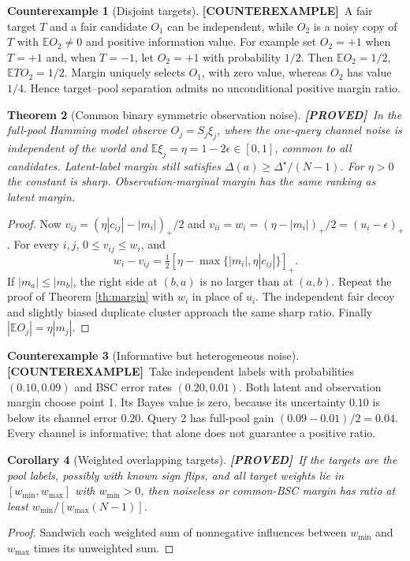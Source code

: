 \documentclass[11pt]{article}
\newtheorem{theorem}{Theorem}[section]
\newtheorem{corollary}[theorem]{Corollary}
\theoremstyle{definition}
\newtheorem{example}[theorem]{Counterexample}
\newcommand{\E}{\mathbb E}
\newcommand{\1}{\mathbf 1}
\newcommand{\pr}{\textbf{[PROVED]}}
\newcommand{\ce}{\textbf{[COUNTEREXAMPLE]}}
\begin{document}
\begin{example}[Disjoint targets]\label{ex:heldout}
\ce\ A fair target $T$ and a fair candidate $O_1$ can be independent, while
$O_2$ is a noisy copy of $T$ with $\E O_2\ne0$ and positive information value.
For example set $O_2=+1$ when $T=+1$ and, when $T=-1$, let $O_2=+1$ with
probability $1/2$. Then $\E O_2=1/2$, $\E TO_2=1/2$.
Margin uniquely selects $O_1$, with zero value, whereas $O_2$ has value $1/4$.
Hence target--pool separation admits no unconditional positive margin ratio.
\end{example}

\begin{theorem}[Common binary symmetric observation noise]\label{th:bsc}
\pr\ In the full-pool Hamming model observe $O_j=S_j\xi_j$, where the
one-query channel noise is independent of the world and
$\E\xi_j=\eta=1-2\epsilon\in[0,1]$, common to all candidates.
Latent-label margin still satisfies $\Delta(a)\ge\Delta^\star/(N-1)$.
For $\eta>0$ the constant is sharp. Observation-marginal margin has the same
ranking as latent margin.
\end{theorem}
\begin{proof}
Now $v_{ij}=(\eta|c_{ij}|-|m_i|)_+/2$ and
$v_{ii}=w_i=(\eta-|m_i|)_+/2=(u_i-\epsilon)_+$.
For every $i,j$, $0\le v_{ij}\le w_i$, and
\[
 w_i-v_{ij}=\tfrac12[\eta-\max\{|m_i|,\eta|c_{ij}|\}]_+.
\]
If $|m_a|\le|m_b|$, the right side at $(b,a)$ is no larger than at $(a,b)$.
Repeat the proof of Theorem \ref{th:margin} with $w_i$ in place of $u_i$.
The independent fair decoy and slightly biased duplicate cluster approach
the same sharp ratio. Finally $|\E O_j|=\eta|m_j|$.
\end{proof}
\begin{example}[Informative but heterogeneous noise]\label{ex:hetero}
\ce\ Take independent labels with probabilities $(0.10,0.09)$ and BSC
error rates $(0.20,0.01)$. Both latent and observation margin choose point 1.
Its Bayes value is zero, because its uncertainty $0.10$ is below its channel
error $0.20$. Query 2 has full-pool gain $(0.09-0.01)/2=0.04$.
Every channel is informative; that alone does not guarantee a positive ratio.
\end{example}
\begin{corollary}[Weighted overlapping targets]
\pr\ If the targets are the pool labels, possibly with known sign flips,
and all target weights lie in $[w_{\min},w_{\max}]$ with $w_{\min}>0$,
then noiseless or common-BSC margin has ratio at least
$w_{\min}/[w_{\max}(N-1)]$.
\end{corollary}
\begin{proof}
Sandwich each weighted sum of nonnegative influences between $w_{\min}$
and $w_{\max}$ times its unweighted sum.
\end{proof}
\end{document}
